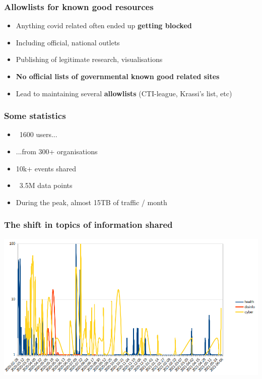 \begin{frame}
 \frametitle{Allowlists for known good resources}
 \begin{itemize}
         \item Anything covid related often ended up {\bf getting blocked}
         \item Including official, national outlets
         \item Publishing of legitimate research, visualisations
         \item {\bf No official lists of governmental known good related sites}
         \item Lead to maintaining several {\bf allowlists} (CTI-league, Krassi's list, etc)
 \end{itemize}
\end{frame}

\begin{frame}
 \frametitle{Some statistics}
 \begin{itemize}
         \item ~1600 users...
         \item ...from 300+ organisations
         \item 10k+ events shared
         \item ~3.5M data points
         \item During the peak, almost 15TB of traffic / month
 \end{itemize}
\end{frame}

\begin{frame}
 \frametitle{The shift in topics of information shared}
 \includegraphics[width=1.00\linewidth]{topics_of_sharing_daily.png}
\end{frame}

